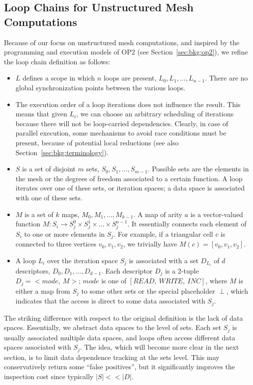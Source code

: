 \subsection{Loop Chains for Unstructured Mesh Computations}
Because of our focus on unstructured mesh computations, and inspired by the programming and execution models of OP2 (see Section~\ref{sec:bkg:op2}), we refine the loop chain definition as follows:
\begin{itemize}
\item $L$ defines a scope in which $n$ loops are present, $L_0, L_1, ..., L_{n-1}$. There are no global synchronization points between the various loops.
\item The execution order of a loop iterations does not influence the result. This means that given $L_i$, we can choose an arbitrary scheduling of iterations because there will not be loop-carried dependencies. Clearly, in case of parallel execution, some mechanisms to avoid race conditions must be present, because of potential local reductions (see also Section~\ref{sec:bkg:terminology}). 
\item $S$ is a set of disjoint $m$ sets, $S_0, S_1, ..., S_{m-1}$. Possible sets are the elements in the mesh or the degrees of freedom associated to a certain function. A loop iterates over one of these sets, or iteration spaces; a data space is associated with one of these sets. 
\item $M$ is a set of $k$ maps, $M_0, M_1, ..., M_{k-1}$. A map of arity $a$ is a vector-valued function $M : S_i \rightarrow S_j^0 \times S_j^1 \times ... \times S_j^{a-1}$. It essentially connects each element of $S_i$ to one or more elements in $S_j$. For example, if a triangular cell $c$ is connected to three vertices $v_0, v_1, v_2$, we trivially have $M(c) = [v_0, v_1, v_2]$. 
\item A loop $L_i$ over the iteration space $S_j$ is associated with a set $D_{L_i}$ of $d$ descriptors, $D_0, D_1, ..., D_{d-1}$. Each descriptor $D_j$ is a 2-tuple $D_j = {<}mode,\ M{>}$; $mode$ is one of $[READ,\ WRITE,\ INC]$, where $M$ is either a map from $S_j$ to some other sets or the special placeholder $\perp$, which indicates that the access is direct to some data associated with $S_j$.
\end{itemize}

The striking difference with respect to the original definition is the lack of data spaces. Essentially, we abstract data spaces to the level of sets. Each set $S_j$ is usually associated multiple data spaces, and loops often access different data spaces associated with $S_j$. The idea, which will become more clear in the next section, is to limit data dependence tracking at the sets level. This may conservatively return some ``false positives'', but it significantly improves the inspection cost since typically $|S| << |D|$. 

